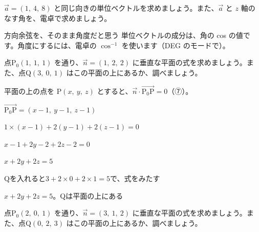 \begin{jibun}
$\vec a=(1,\ 4,\ 8)$ と同じ向きの単位ベクトルを求めましょう。また、$\vec a$ と $z$ 軸のなす角を、電卓で求めましょう。
\end{jibun}

\begin{tsumazuki}{方向余弦を、そのまま角度だと思う}
単位ベクトルの成分は、角の cos の値です。角度にするには、電卓の $\cos^{-1}$ を使います（DEG のモードで）。
\end{tsumazuki}

\begin{reidai}[法線ベクトルと平面の式]
点P$_0(1,\ 1,\ 1)$ を通り、$\vec n=(1,\ 2,\ 2)$ に垂直な平面の式を求めましょう。また、点Q$(3,\ 0,\ 1)$ はこの平面の上にあるか、調べましょう。\par
\kangaekata 平面の上の点を P$(x,\ y,\ z)$ とすると、$\vec n\cdot\overrightarrow{\mathrm{P_0P}}=0$（⑦）。\par
\shiki $\overrightarrow{\mathrm{P_0P}}=(x-1,\ y-1,\ z-1)$\par
\hspace*{2.6\zw}$1\times(x-1)+2(y-1)+2(z-1)=0$\par
\hspace*{2.6\zw}$x-1+2y-2+2z-2=0$\par
\hspace*{2.6\zw}$x+2y+2z=5$\par
\hspace*{2.6\zw}Qを入れると\enspace $3+2\times0+2\times1=5$\enspace で、式をみたす\par
\kotae $x+2y+2z=5$。Qは平面の上にある
\end{reidai}

\begin{jibun}
点P$_0(2,\ 0,\ 1)$ を通り、$\vec n=(3,\ 1,\ 2)$ に垂直な平面の式を求めましょう。また、点Q$(0,\ 2,\ 3)$ はこの平面の上にあるか、調べましょう。
\end{jibun}


